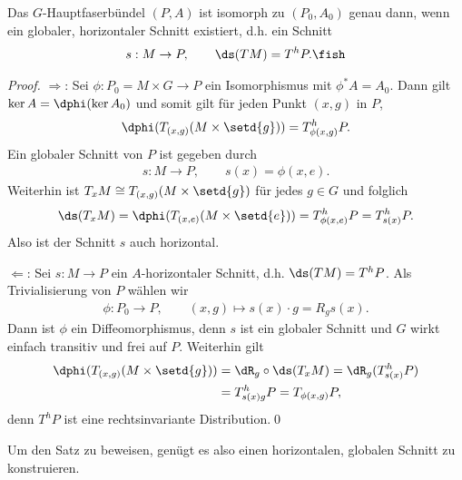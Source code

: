 \documentclass[%
	paper=a5,%
	fleqn,%
	DIV=18,%
	BCOR=0mm,
	fontsize=11pt,
	titlepage=false,%
	bibliography=totoc,
	DIV=18,%
	twoside=true,
	pdftitle=Riemannsche Geometrie,
	pdfauthor=Uwe Semmelmann,
	numbers=noendperiod]%
	{scrbook}
\begin{document}
\begin{lem}
Das $G$-Hauptfaserbündel $(P,A)$ ist isomorph zu $(P_0,A_0)$ genau dann, wenn
ein globaler, horizontaler Schnitt existiert, d.h. ein Schnitt
\begin{align*}
s: M\to P,\qquad \ds(TM) = T^hP.\fish
\end{align*}
\end{lem}
\begin{proof}
$\Rightarrow$: Sei $\phi\colon P_0=M\times G\to P$ ein Isomorphismus mit $\phi^* A =
A_0$. Dann gilt $\ker A = \dphi(\ker A_0)$ und somit gilt für jeden Punkt
$(x,g)$ in $P$,
\begin{align*}
\dphi(T_{(x,g)} (M\times \setd{g})) = T^h_{\phi(x,g)}P.
\end{align*}
Ein globaler Schnitt von $P$ ist gegeben durch
\begin{align*}
s: M\to P,\qquad s(x) = \phi(x,e).
\end{align*}
Weiterhin ist $T_xM \cong T_{(x,g)} (M\times \setd{g})$ für jedes $g\in G$ und
folglich
\begin{align*}
\ds(T_xM) = \dphi(T_{(x,e)} (M\times \setd{e})) = T^h_{\phi(x,e)}P =
T^h_{s(x)}P.
\end{align*}
Also ist der Schnitt $s$ auch horizontal.

$\Leftarrow$: Sei $s\colon M\to P$ ein $A$-horizontaler Schnitt, d.h. $\ds(TM) =
T^hP$. Als Trivialisierung von $P$ wählen wir
\begin{align*}
\phi\colon P_0\to P,\qquad (x,g) \mapsto s(x)\cdot g = R_g s(x).
\end{align*}
Dann ist $\phi$ ein Diffeomorphismus, denn $s$ ist ein globaler Schnitt und $G$
wirkt einfach transitiv und frei auf $P$. Weiterhin gilt
\begin{align*}
\dphi(T_{(x,g)}(M\times \setd{g})) &= \dR_g\circ \ds(T_xM) = 
\dR_g(T_{s(x)}^hP) \\ &= T_{s(x)g}^hP = T_{\phi(x,g)}P,
\end{align*}
denn $T^hP$ ist eine rechtsinvariante Distribution.\qed
\end{proof}

Um den Satz zu beweisen, genügt es also einen horizontalen, globalen Schnitt zu
konstruieren.
\end{document}
